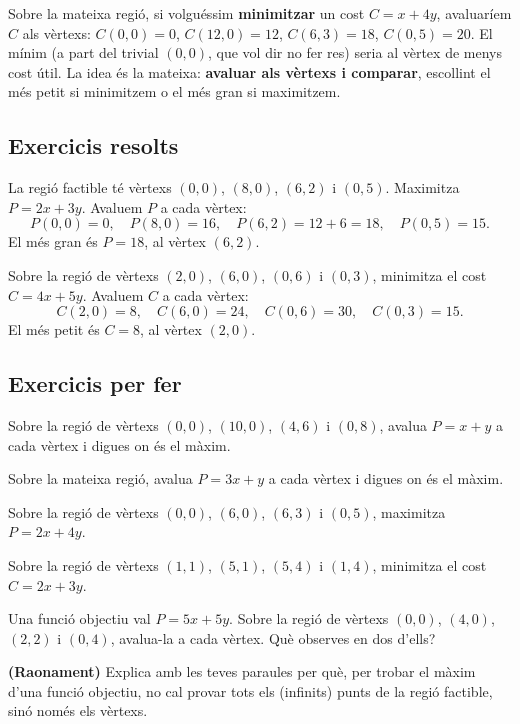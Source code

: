 \begin{exemple}
Sobre la mateixa regió, si volguéssim \textbf{minimitzar} un cost $C=x+4y$,
avaluaríem $C$ als vèrtexs: $C(0,0)=0$, $C(12,0)=12$, $C(6,3)=18$, $C(0,5)=20$. El
mínim (a part del trivial $(0,0)$, que vol dir no fer res) seria al vèrtex de menys
cost útil. La idea és la mateixa: \textbf{avaluar als vèrtexs i comparar}, escollint el
més petit si minimitzem o el més gran si maximitzem.
\end{exemple}

\subsection{Exercicis resolts}

\begin{exresolt}
La regió factible té vèrtexs $(0,0)$, $(8,0)$, $(6,2)$ i $(0,5)$. Maximitza
$P=2x+3y$.
\solucio
Avaluem $P$ a cada vèrtex:
\[
P(0,0)=0,\quad P(8,0)=16,\quad P(6,2)=12+6=18,\quad P(0,5)=15.
\]
El més gran és $P=18$, al vèrtex $(6,2)$.
\end{exresolt}

\begin{exresolt}
Sobre la regió de vèrtexs $(2,0)$, $(6,0)$, $(0,6)$ i $(0,3)$, minimitza el cost
$C=4x+5y$.
\solucio
Avaluem $C$ a cada vèrtex:
\[
C(2,0)=8,\quad C(6,0)=24,\quad C(0,6)=30,\quad C(0,3)=15.
\]
El més petit és $C=8$, al vèrtex $(2,0)$.
\end{exresolt}

\subsection{Exercicis per fer}

\begin{exercicis}
\begin{exlist}
  \item Sobre la regió de vèrtexs $(0,0)$, $(10,0)$, $(4,6)$ i $(0,8)$, avalua
        $P=x+y$ a cada vèrtex i digues on és el màxim.
  \item Sobre la mateixa regió, avalua $P=3x+y$ a cada vèrtex i digues on és el màxim.
  \item Sobre la regió de vèrtexs $(0,0)$, $(6,0)$, $(6,3)$ i $(0,5)$, maximitza
        $P=2x+4y$.
  \item Sobre la regió de vèrtexs $(1,1)$, $(5,1)$, $(5,4)$ i $(1,4)$, minimitza el
        cost $C=2x+3y$.
  \item Una funció objectiu val $P=5x+5y$. Sobre la regió de vèrtexs $(0,0)$, $(4,0)$,
        $(2,2)$ i $(0,4)$, avalua-la a cada vèrtex. Què observes en dos d'ells?
  \item \textbf{(Raonament)} Explica amb les teves paraules per què, per trobar el
        màxim d'una funció objectiu, no cal provar tots els (infinits) punts de la
        regió factible, sinó només els vèrtexs.
\end{exlist}
\end{exercicis}

